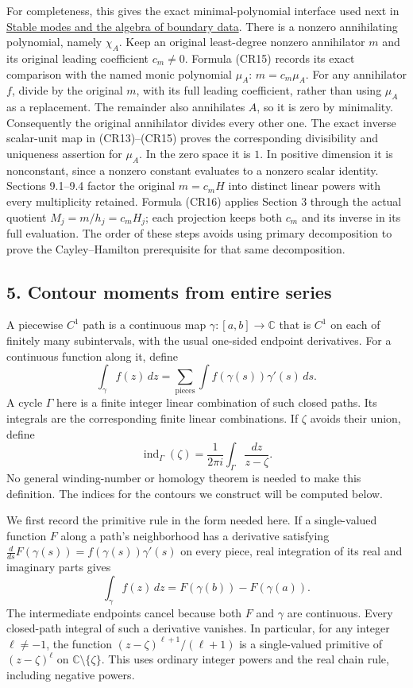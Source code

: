 \documentclass[
  11pt,
]{article}
\begin{document}
For completeness, this gives the exact minimal-polynomial interface used
next in \href{stable-boundary-models.pdf}{Stable modes and the algebra of
boundary data}. There is a nonzero annihilating polynomial, namely
\(\chi_A\). Keep an original least-degree nonzero annihilator \(m\) and
its original leading coefficient \(c_m\ne0\). Formula (CR15) records its
exact comparison with the named monic polynomial \(\mu_A\):
\(m=c_m\mu_A\). For any annihilator \(f\), divide by the original \(m\),
with its full leading coefficient, rather than using \(\mu_A\) as a
replacement. The remainder also annihilates \(A\), so it is zero by
minimality. Consequently the original annihilator divides every other
one. The exact inverse scalar-unit map in (CR13)--(CR15) proves the
corresponding divisibility and uniqueness assertion for \(\mu_A\). In
the zero space it is \(1\). In positive dimension it is nonconstant,
since a nonzero constant evaluates to a nonzero scalar identity.
Sections 9.1--9.4 factor the original \(m=c_mH\) into distinct linear
powers with every multiplicity retained. Formula (CR16) applies Section
3 through the actual quotient \(M_j=m/h_j=c_mH_j\); each projection
keeps both \(c_m\) and its inverse in its full evaluation. The order of
these steps avoids using primary decomposition to prove the
Cayley--Hamilton prerequisite for that same decomposition.

\subsection{5. Contour moments from entire
series}\label{contour-moments-from-entire-series}

A piecewise \(C^1\) path is a continuous map
\(\gamma:[a,b]\to\mathbb C\) that is \(C^1\) on each of finitely many
subintervals, with the usual one-sided endpoint derivatives. For a
continuous function along it, define \[
\int_\gamma f(z)\,dz=\sum_{\text{pieces}}\int f(\gamma(s))\gamma'(s)\,ds.
\] A cycle \(\Gamma\) here is a finite integer linear combination of
such closed paths. Its integrals are the corresponding finite linear
combinations. If \(\zeta\) avoids their union, define \[
\operatorname{ind}_\Gamma(\zeta)
=\frac{1}{2\pi i}\int_\Gamma\frac{dz}{z-\zeta}.
\] No general winding-number or homology theorem is needed to make this
definition. The indices for the contours we construct will be computed
below.

We first record the primitive rule in the form needed here. If a
single-valued function \(F\) along a path's neighborhood has a
derivative satisfying
\(\frac{d}{ds}F(\gamma(s))=f(\gamma(s))\gamma'(s)\) on every piece, real
integration of its real and imaginary parts gives \[
\int_\gamma f(z)\,dz=F(\gamma(b))-F(\gamma(a)).
\] The intermediate endpoints cancel because both \(F\) and \(\gamma\)
are continuous. Every closed-path integral of such a derivative
vanishes. In particular, for any integer \(\ell\ne-1\), the function
\((z-\zeta)^{\ell+1}/(\ell+1)\) is a single-valued primitive of
\((z-\zeta)^\ell\) on \(\mathbb C\setminus\{\zeta\}\). This uses
ordinary integer powers and the real chain rule, including negative
powers.
\end{document}
